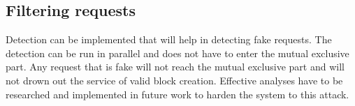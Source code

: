 \subsection{Filtering requests}

Detection can be implemented that will help in detecting fake requests.
The detection can be run in parallel and does not have to enter the mutual exclusive part.
Any request that is fake will not reach the mutual exclusive part
and will not drown out the service of valid block creation.
Effective analyses have to be researched and implemented in future work to harden the system to this attack.

